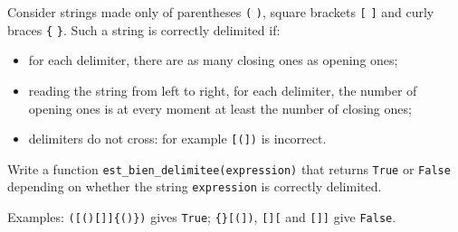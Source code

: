 Consider strings made only of parentheses \texttt{(} \texttt{)}, square brackets \texttt{[} \texttt{]} and curly braces \texttt{\{} \texttt{\}}. Such a string is correctly delimited if:
\begin{itemize}
\item for each delimiter, there are as many closing ones as opening ones;
\item reading the string from left to right, for each delimiter, the number of opening ones is at every moment at least the number of closing ones;
\item delimiters do not cross: for example \texttt{[(])} is incorrect.
\end{itemize}
Write a function \texttt{est\_bien\_delimitee(expression)} that returns \texttt{True} or \texttt{False} depending on whether the string \texttt{expression} is correctly delimited.

Examples: \texttt{([()[]]\{()\})} gives \texttt{True}; \texttt{\{\}[(])}, \texttt{[][} and \texttt{[]]} give \texttt{False}.
